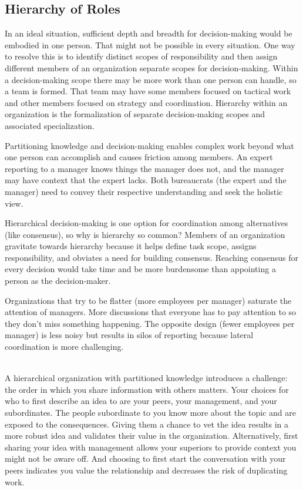 \subsection*{Hierarchy of Roles\label{sec:hierarchy-of-roles}}


In an ideal situation, sufficient depth and breadth for decision-making would be embodied in one person. That might not be possible in every situation. One way to resolve this is to identify distinct scopes of responsibility and then assign different members of an organization separate scopes for decision-making. Within a decision-making scope there may be more work than one person can handle, so a team is formed. That team may have some members focused on tactical work and other members focused on strategy and coordination. Hierarchy within an organization is the formalization of separate decision-making scopes and associated specialization. 

Partitioning knowledge and decision-making enables complex work beyond what one person can accomplish and causes friction among members. An expert reporting to a manager knows things the manager does not, and the manager may have context that the expert lacks. Both bureaucrats (the expert and the manager) need to convey their respective understanding and seek the holistic view.

Hierarchical decision-making is one option for coordination among alternatives (like consensus), so why is hierarchy so common? Members of an organization gravitate towards hierarchy because it helps define task scope, assigns responsibility, and obviates a need for building consensus. Reaching consensus for every decision would take time and be more burdensome than appointing a person as the decision-maker.

Organizations that try to be flatter (more employees per manager) saturate the attention of managers. More discussions that everyone has to pay attention to so they don't miss something happening. The opposite design (fewer employees per manager) is less noisy but results in silos of reporting because lateral coordination is more challenging.

\ \\

A hierarchical organization with partitioned knowledge introduces a challenge: the order in which you share information with others matters. Your choices for who to first describe an idea to are your peers, your management, and your subordinates. 
The people subordinate to you know more about the topic and are exposed to the consequences. Giving them a chance to vet the idea results in a more robust idea and validates their value in the organization. Alternatively, first sharing your idea with management  allows your superiors to provide context you might not be aware off. And choosing to first start the conversation with your peers indicates you value the relationship and decreases the risk of duplicating work.

